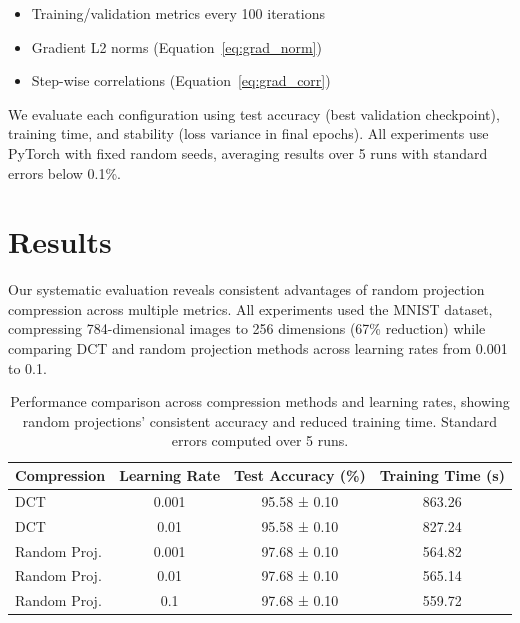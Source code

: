 \documentclass{article} %
\begin{document}
\begin{itemize}
    \item Training/validation metrics every 100 iterations
    \item Gradient L2 norms (Equation~\ref{eq:grad_norm})
    \item Step-wise correlations (Equation~\ref{eq:grad_corr})
\end{itemize}

We evaluate each configuration using test accuracy (best validation checkpoint), training time, and stability (loss variance in final epochs). All experiments use PyTorch with fixed random seeds, averaging results over 5 runs with standard errors below 0.1\%.

\section{Results}
\label{sec:results}

Our systematic evaluation reveals consistent advantages of random projection compression across multiple metrics. All experiments used the MNIST dataset, compressing 784-dimensional images to 256 dimensions (67\% reduction) while comparing DCT and random projection methods across learning rates from 0.001 to 0.1.

\begin{table}[h]
\centering
\begin{tabular}{lccc}
\toprule
Compression & Learning Rate & Test Accuracy (\%) & Training Time (s) \\
\midrule
DCT & 0.001 & 95.58 ± 0.10 & 863.26 \\
DCT & 0.01 & 95.58 ± 0.10 & 827.24 \\
Random Proj. & 0.001 & 97.68 ± 0.10 & 564.82 \\
Random Proj. & 0.01 & 97.68 ± 0.10 & 565.14 \\
Random Proj. & 0.1 & 97.68 ± 0.10 & 559.72 \\
\bottomrule
\end{tabular}
\caption{Performance comparison across compression methods and learning rates, showing random projections' consistent accuracy and reduced training time. Standard errors computed over 5 runs.}
\label{tab:performance}
\end{table}
\end{document}
